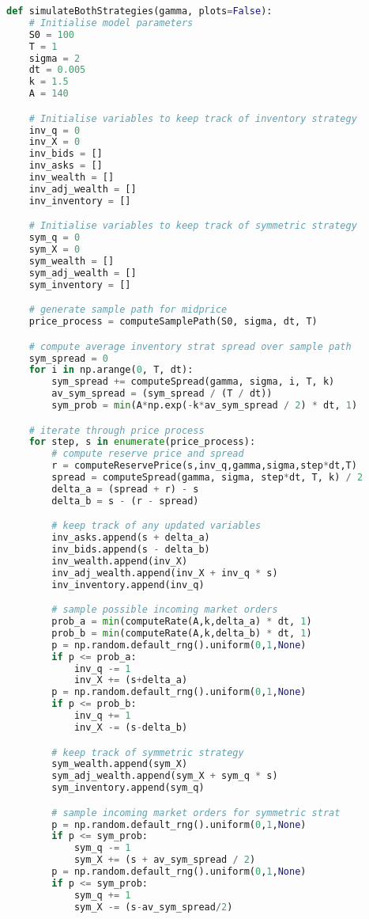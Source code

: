 \begin{lstlisting}[language=Python, caption=Avellaneda-Stoikov Model]
def simulateBothStrategies(gamma, plots=False):
    # Initialise model parameters
    S0 = 100
    T = 1
    sigma = 2
    dt = 0.005
    k = 1.5
    A = 140

    # Initialise variables to keep track of inventory strategy
    inv_q = 0
    inv_X = 0
    inv_bids = []
    inv_asks = []
    inv_wealth = []
    inv_adj_wealth = []
    inv_inventory = []

    # Initialise variables to keep track of symmetric strategy
    sym_q = 0 
    sym_X = 0
    sym_wealth = []
    sym_adj_wealth = []
    sym_inventory = []

    # generate sample path for midprice
    price_process = computeSamplePath(S0, sigma, dt, T)

    # compute average inventory strat spread over sample path
    sym_spread = 0 
    for i in np.arange(0, T, dt):
        sym_spread += computeSpread(gamma, sigma, i, T, k)
        av_sym_spread = (sym_spread / (T / dt))
        sym_prob = min(A*np.exp(-k*av_sym_spread / 2) * dt, 1)

    # iterate through price process
    for step, s in enumerate(price_process):
        # compute reserve price and spread
        r = computeReservePrice(s,inv_q,gamma,sigma,step*dt,T)
        spread = computeSpread(gamma, sigma, step*dt, T, k) / 2
        delta_a = (spread + r) - s
        delta_b = s - (r - spread)

        # keep track of any updated variables
        inv_asks.append(s + delta_a)
        inv_bids.append(s - delta_b)
        inv_wealth.append(inv_X)
        inv_adj_wealth.append(inv_X + inv_q * s)
        inv_inventory.append(inv_q)

        # sample possible incoming market orders
        prob_a = min(computeRate(A,k,delta_a) * dt, 1)
        prob_b = min(computeRate(A,k,delta_b) * dt, 1)
        p = np.random.default_rng().uniform(0,1,None)
        if p <= prob_a:
            inv_q -= 1
            inv_X += (s+delta_a)
        p = np.random.default_rng().uniform(0,1,None)
        if p <= prob_b:
            inv_q += 1
            inv_X -= (s-delta_b)

        # keep track of symmetric strategy
        sym_wealth.append(sym_X) 
        sym_adj_wealth.append(sym_X + sym_q * s)
        sym_inventory.append(sym_q)

        # sample incoming market orders for symmetric strat
        p = np.random.default_rng().uniform(0,1,None)
        if p <= sym_prob:
            sym_q -= 1
            sym_X += (s + av_sym_spread / 2)
        p = np.random.default_rng().uniform(0,1,None)
        if p <= sym_prob:
            sym_q += 1
            sym_X -= (s-av_sym_spread/2)


\end{lstlisting}

